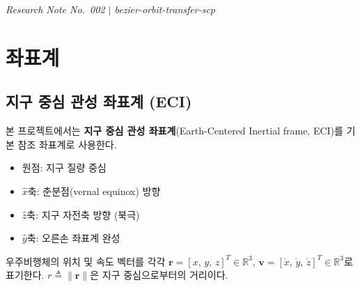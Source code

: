 \documentclass[11pt]{article}
\begin{document}
\drawborder
\thispagestyle{firstpage}


{\normalsize\textit{Research Note No.~002 $|$ bezier-orbit-transfer-scp}}\par\medskip

\def\lighterdate{March 12, 2026}


\begin{abstract}
본 보고서는 베지어 곡선 기반 궤도전이 궤적최적화의 기반이 되는 3차원 궤도 동역학 방정식을
체계적으로 정리한다.
지구 중심 관성 좌표계에서의 2체 문제를 출발점으로 하여,
구면조화함수 섭동(J2--J6), 대기항력, 태양복사압, 3체 섭동을 계층적으로 기술한다.
또한 각 섭동 항의 상대적 크기를 정량적으로 분석하여 궤도 영역별로 고려해야 할 섭동의 우선순위를 제시한다.
\cite{report001}에서 정의한 정규화 단위를 적용하여 모든 방정식을 무차원 형태로 표현한다.
\end{abstract}

\section{좌표계}

\subsection{지구 중심 관성 좌표계 (ECI)}

본 프로젝트에서는 \textbf{지구 중심 관성 좌표계}(Earth-Centered Inertial frame, ECI)를
기본 참조 좌표계로 사용한다.

\begin{itemize}
  \item 원점: 지구 질량 중심
  \item $\hat{x}$축: 춘분점(vernal equinox) 방향
  \item $\hat{z}$축: 지구 자전축 방향 (북극)
  \item $\hat{y}$축: 오른손 좌표계 완성
\end{itemize}

우주비행체의 위치 및 속도 벡터를 각각 $\mathbf{r} = [x,\,y,\,z]^T \in \mathbb{R}^3$,
$\mathbf{v} = [\dot{x},\,\dot{y},\,\dot{z}]^T \in \mathbb{R}^3$로 표기한다.
$r \triangleq \|\mathbf{r}\|$은 지구 중심으로부터의 거리이다.
\end{document}
